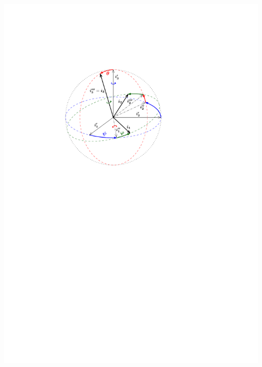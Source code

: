 \documentclass[final,landscape,hardcopy]{notes}
\begin{document}
\begin{multicols*}{4}
\begin{enumerate}
    \includegraphics[width=1.0\linewidth]{euler_ang.pdf}
  

\end{enumerate}
\end{multicols*}
\end{document}
